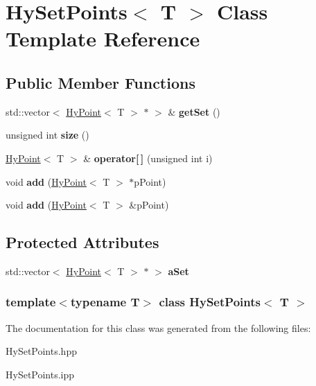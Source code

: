 \hypertarget{classHySetPoints}{
\section{HySetPoints$<$ T $>$ Class Template Reference}
\label{classHySetPoints}
}
\subsection*{Public Member Functions}
\begin{DoxyCompactItemize}
\item 
\hypertarget{classHySetPoints_a8ca08da4c53feebbaf3d2ca9903831ef}{
std::vector$<$ \hyperlink{classHyPoint}{HyPoint}$<$ T $>$ $\ast$ $>$ \& {\bfseries getSet} ()}
\label{classHySetPoints_a8ca08da4c53feebbaf3d2ca9903831ef}

\item 
\hypertarget{classHySetPoints_a127c51e7b1ea4712ab443b2f3479d88f}{
unsigned int {\bfseries size} ()}
\label{classHySetPoints_a127c51e7b1ea4712ab443b2f3479d88f}

\item 
\hypertarget{classHySetPoints_a99697790811a1c3f38cde3255810f62e}{
\hyperlink{classHyPoint}{HyPoint}$<$ T $>$ \& {\bfseries operator\mbox{[}$\,$\mbox{]}} (unsigned int i)}
\label{classHySetPoints_a99697790811a1c3f38cde3255810f62e}

\item 
\hypertarget{classHySetPoints_a64e34251bcc54b6b69e09b53691c7724}{
void {\bfseries add} (\hyperlink{classHyPoint}{HyPoint}$<$ T $>$ $\ast$pPoint)}
\label{classHySetPoints_a64e34251bcc54b6b69e09b53691c7724}

\item 
\hypertarget{classHySetPoints_afa41d38a489c9ee60b42d2d354cb48fb}{
void {\bfseries add} (\hyperlink{classHyPoint}{HyPoint}$<$ T $>$ \&pPoint)}
\label{classHySetPoints_afa41d38a489c9ee60b42d2d354cb48fb}

\end{DoxyCompactItemize}
\subsection*{Protected Attributes}
\begin{DoxyCompactItemize}
\item 
\hypertarget{classHySetPoints_a1c4d2f32fe0aeb85f1efb6aad3b23d44}{
std::vector$<$ \hyperlink{classHyPoint}{HyPoint}$<$ T $>$ $\ast$ $>$ {\bfseries aSet}}
\label{classHySetPoints_a1c4d2f32fe0aeb85f1efb6aad3b23d44}

\end{DoxyCompactItemize}
\subsubsection*{template$<$typename T$>$ class HySetPoints$<$ T $>$}



The documentation for this class was generated from the following files:\begin{DoxyCompactItemize}
\item 
HySetPoints.hpp\item 
HySetPoints.ipp\end{DoxyCompactItemize}
